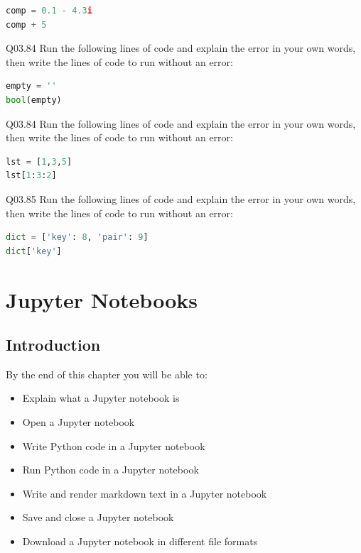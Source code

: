 \documentclass{book}
\newenvironment{problems}{}{}  %
\begin{document}
\begin{problems}
\begin{lstlisting}[language=Python]
comp = 0.1 - 4.3i
comp + 5
\end{lstlisting}

Q03.84 Run the following lines of code and explain the error in your own
words, then write the lines of code to run without an error:

\begin{lstlisting}[language=Python]
empty = ''
bool(empty)
\end{lstlisting}

Q03.84 Run the following lines of code and explain the error in your own
words, then write the lines of code to run without an error:

\begin{lstlisting}[language=Python]
lst = [1,3,5]
lst[1:3:2]
\end{lstlisting}

Q03.85 Run the following lines of code and explain the error in your own
words, then write the lines of code to run without an error:

\begin{lstlisting}[language=Python]
dict = ['key': 8, 'pair': 9]
dict['key']
\end{lstlisting}
        \end{problems}

    




    
        \chapter{Jupyter Notebooks}\label{jupyter-notebooks}
    




    
        \section{Introduction}\label{introduction}
    




    
        By the end of this chapter you will be able to:

\begin{itemize}
\item
  Explain what a Jupyter notebook is
\item
  Open a Jupyter notebook
\item
  Write Python code in a Jupyter notebook
\item
  Run Python code in a Jupyter notebook
\item
  Write and render markdown text in a Jupyter notebook
\item
  Save and close a Jupyter notebook
\item
  Download a Jupyter notebook in different file formats
\end{itemize}
        \newpage
\end{document}
